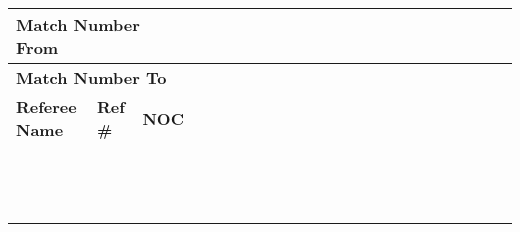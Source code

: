 \documentclass[letterpaper,12pt]{article}
\begin{document}
	
	
	\centering
	\footnotesize %
	\setlength\doublerulesep{0.5cm} 
	\begin{tabular}{|p{4.5cm}|p{1.1cm}|p{1.1cm}
			|p{0.5cm}|p{0.5cm}|p{0.5cm}|p{0.5cm}|p{0.5cm}|p{0.5cm}|p{0.5cm}|p{0.5cm}|p{0.5cm}|p{0.5cm}|p{0.5cm}|p{0.5cm}|p{0.5cm}|p{0.5cm}|p{0.5cm}|p{0.5cm}|p{0.5cm}|p{0.5cm}|p{0.5cm}|p{0.5cm}|}
		\hline
		\multicolumn{3}{|l|}{\textbf{Match Number From}} & & & & & & & & & & & & & & & & & & & & \\
		\hline
		\multicolumn{3}{|l|}{\textbf{Match Number To}} & & & & & & & & & & & & & & & & & & & & \\		
		\hline
		\hline
		\textbf{Referee Name} & \textbf{Ref \#} & \textbf{NOC} & & & & & & & & & & & & & & & & & & & & \\
		\hline
		& & & & & & & & & & & & & & & & & & & & & & \\
		\hline
		& & & & & & & & & & & & & & & & & & & & & & \\
		\hline
		& & & & & & & & & & & & & & & & & & & & & & \\
		\hline
		& & & & & & & & & & & & & & & & & & & & & & \\
		\hline
		& & & & & & & & & & & & & & & & & & & & & & \\
		\hline
		& & & & & & & & & & & & & & & & & & & & & & \\
		\hline
		& & & & & & & & & & & & & & & & & & & & & & \\
		\hline
		& & & & & & & & & & & & & & & & & & & & & & \\
		\hline
		& & & & & & & & & & & & & & & & & & & & & & \\
		\hline
		& & & & & & & & & & & & & & & & & & & & & & \\
		\hline
		& & & & & & & & & & & & & & & & & & & & & & \\
		\hline
		& & & & & & & & & & & & & & & & & & & & & & \\
		\hline
		& & & & & & & & & & & & & & & & & & & & & & \\
		\hline
		
	\end{tabular}
	
\end{document}
